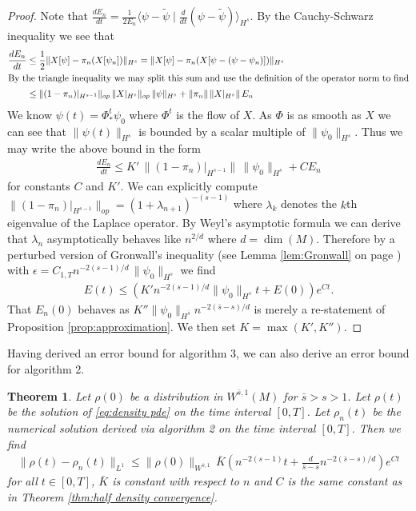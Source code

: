 \documentclass[12pt]{amsart}
\newtheorem{thm}{Theorem}[section]
\begin{document}
\begin{proof}
	Note that $\frac{dE_{n}}{dt} = \frac{1}{2E_{n}} \langle  \psi - \tilde{\psi} \mid \frac{d}{dt} ( \psi -\tilde{\psi} )\rangle_{H^{s}}$.
	By the Cauchy-Schwarz inequality we see that
	\begin{align}
		\frac{dE_{n}}{dt} &\leq  \frac{1}{2} \| X[\psi] - \pi_{n}(X[\psi_{n}]) \|_{H^{s}} = \| X[\psi] - \pi_{n}( X[\psi- (\psi-\psi_{n})]) \|_{H^{s}} \\
	\intertext{By the triangle inequality we may split this sum and use the definition of the operator norm to find}
		&\leq \| (1-\pi_{n})|_{H^{s-1}} \|_{op} \, \|X|_{H^{s}} \|_{op} \, \| \psi \|_{H^{s}} + \| \pi_{n} \| \, \|X|_{H^{s}} \| \, E_{n} \\
	\end{align}
	We know $\psi(t) = \Phi^{t}_{*}\psi_{0}$ where $\Phi^{t}$ is the flow of $X$.
	As $\Phi$ is as smooth as $X$ we can see that $\| \psi(t) \|_{H^{s}}$ is bounded by a scalar multiple of $\| \psi_{0} \|_{H^{s}}$.
	Thus we may write the above bound in the form
	\begin{align}
		\frac{dE_{n}}{dt} \leq K' \, \| (1- \pi_{n})|_{H^{s-1}} \| \, \| \psi_{0}\|_{H^{s}}+ C E_{n}
	\end{align}
	for constants $C$ and $K'$.
	We can explicitly compute $\| (1-\pi_{n})|_{H^{s-1}} \|_{op} = (1+\lambda_{n+1})^{-(s-1)}$ where $\lambda_{k}$ denotes the $k$th eigenvalue of the Laplace operator.
	By Weyl's asymptotic formula \cite[Theorem B.2]{Chavel1984} we
	can derive that $\lambda_{n}$ asymptotically behaves like $n^{2/d}$ where $d = \dim(M)$.
	Therefore by a perturbed version of Gronwall's inequality (see Lemma \ref{lem:Gronwall} on page \pageref{lem:Gronwall}) with $\epsilon = C_{1,T} n^{-2(s-1) / d} \, \| \psi_{0}\|_{H^{s}}$
	we find
	\begin{align}
		E(t) \leq ( K' n^{-2(s-1) / d} \| \psi_{0} \|_{H^{s}} t+  E(0) ) e^{C t}.
	\end{align}
	That $E_{n}(0)$ behaves as $K'' \| \psi_{0} \|_{H^{\bar{s}}} n^{-2(\bar{s}-s)/d}$ is merely a re-statement of Proposition \ref{prop:approximation}.
	We then set $K = \max(K', K'')$.
\end{proof}

Having derived an error bound for algorithm 3, we can also derive an error bound for algorithm 2.

\begin{thm} \label{thm:density convergence}
	Let $\rho(0)$ be a distribution in $W^{\bar{s},1}(M)$ for $\bar{s} > s >1$.
	Let $\rho(t)$ be the solution of \eqref{eq:density pde} on the time interval $[0,T]$.
	Let $\rho_{n}(t)$ be the numerical solution derived via algorithm 2 on the time interval $[0,T]$.
	Then we find
	\begin{align}
		\| \rho(t) - \rho_{n}(t) \|_{L^{1}} \leq \| \rho(0) \|_{W^{\bar{s},1}} \, \bar{K} \left( n^{-2(s-1)} t+  \frac{d}{\bar{s}-s} n^{-2(\bar{s}-s)/d} \right) e^{C t}
	\end{align}
	for all $t \in [0,T]$, $\bar{K}$ is constant with respect to $n$ and $C$ is the same constant as in Theorem \ref{thm:half density convergence}.
\end{thm}
\end{document}
